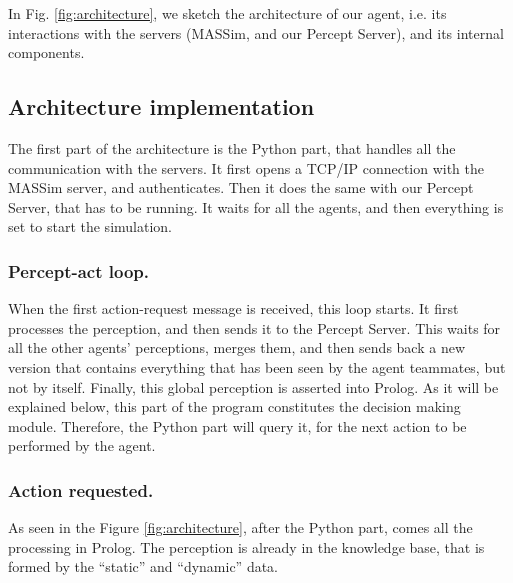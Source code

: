 \documentclass{llncs2e/llncs}
\begin{document}

    In Fig. \ref{fig:architecture}, we sketch the architecture of our agent, 
    i.e. its interactions with the servers (MASSim, and our Percept Server), 
    and its internal components.
 

\subsection{Architecture implementation}


    The first part of the architecture is the Python part, that handles all the 
    communication with the servers. It first opens a TCP/IP connection with the 
    MASSim server, and authenticates. Then it does the same with our Percept 
    Server, that has to be running. It waits for all the agents, and then 
    everything is set to start the simulation.

\subsubsection{Percept-act loop.}

    When the first action-request message is received, this loop starts. It 
    first processes the perception, and then sends it to the Percept Server. 
    This waits for all the other agents' perceptions, merges them, and then sends 
    back a new version that contains everything that has been seen by the agent 
    teammates, but not by itself. Finally, this global perception is asserted 
    into Prolog. 
    As it will be explained below, this part of the program constitutes the 
    decision making module. Therefore, the Python part will query it, for the
    next action to be performed by the agent.
    
\subsubsection{Action requested.}

    As seen in the Figure \ref{fig:architecture}, after the Python part, comes 
    all the processing in Prolog. The perception is already in the knowledge 
    base, that is formed by the ``static'' and ``dynamic'' data. 
\end{document}
